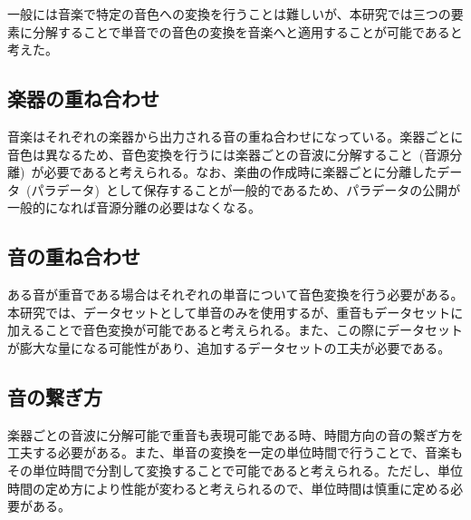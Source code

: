 一般には音楽で特定の音色への変換を行うことは難しいが、本研究では三つの要素に分解することで単音での音色の変換を音楽へと適用することが可能であると考えた。

\subsection{楽器の重ね合わせ}
    
音楽はそれぞれの楽器から出力される音の重ね合わせになっている。楽器ごとに音色は異なるため、音色変換を行うには楽器ごとの音波に分解すること~(音源分離)~が必要であると考えられる。なお、楽曲の作成時に楽器ごとに分離したデータ~(パラデータ)~として保存することが一般的であるため、パラデータの公開が一般的になれば音源分離の必要はなくなる。

\subsection{音の重ね合わせ}

ある音が重音である場合はそれぞれの単音について音色変換を行う必要がある。本研究では、データセットとして単音のみを使用するが、重音もデータセットに加えることで音色変換が可能であると考えられる。また、この際にデータセットが膨大な量になる可能性があり、追加するデータセットの工夫が必要である。

\subsection{音の繋ぎ方}

楽器ごとの音波に分解可能で重音も表現可能である時、時間方向の音の繋ぎ方を工夫する必要がある。また、単音の変換を一定の単位時間で行うことで、音楽もその単位時間で分割して変換することで可能であると考えられる。ただし、単位時間の定め方により性能が変わると考えられるので、単位時間は慎重に定める必要がある。


